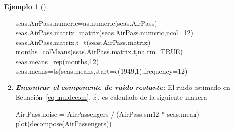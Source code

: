 \documentclass[
  us-letterpaper,
]{scrreprt}
\newenvironment{Shaded}{\begin{snugshade}}{\end{snugshade}}
\newcommand{\AttributeTok}[1]{\textcolor[rgb]{0.40,0.45,0.13}{#1}}
\newcommand{\ConstantTok}[1]{\textcolor[rgb]{0.56,0.35,0.01}{#1}}
\newcommand{\DecValTok}[1]{\textcolor[rgb]{0.68,0.00,0.00}{#1}}
\newcommand{\FunctionTok}[1]{\textcolor[rgb]{0.28,0.35,0.67}{#1}}
\newcommand{\NormalTok}[1]{\textcolor[rgb]{0.00,0.23,0.31}{#1}}
\newcommand{\OtherTok}[1]{\textcolor[rgb]{0.00,0.23,0.31}{#1}}
\newcommand{\SpecialCharTok}[1]{\textcolor[rgb]{0.37,0.37,0.37}{#1}}
\theoremstyle{definition}
\newtheorem{example}{Ejemplo}[chapter]
\theoremstyle{plain}
\theoremstyle{plain}
\theoremstyle{definition}
\theoremstyle{remark}
\begin{document}
\begin{example}[]
\begin{tcolorbox}
\begin{enumerate}
\begin{Shaded}
\begin{Highlighting}[]
\NormalTok{seas.AirPass.numeric}\OtherTok{=}\FunctionTok{as.numeric}\NormalTok{(seas.AirPass) }
\NormalTok{seas.AirPass.matrix}\OtherTok{=}\FunctionTok{matrix}\NormalTok{(seas.AirPass.numeric,}\AttributeTok{ncol=}\DecValTok{12}\NormalTok{) }
\NormalTok{seas.AirPass.matrix.t}\OtherTok{=}\FunctionTok{t}\NormalTok{(seas.AirPass.matrix) }
\NormalTok{months}\OtherTok{=}\FunctionTok{colMeans}\NormalTok{(seas.AirPass.matrix.t,}\AttributeTok{na.rm=}\ConstantTok{TRUE}\NormalTok{) }
\NormalTok{seas.means}\OtherTok{=}\FunctionTok{rep}\NormalTok{(months,}\DecValTok{12}\NormalTok{) }
\NormalTok{seas.means}\OtherTok{=}\FunctionTok{ts}\NormalTok{(seas.means,}\AttributeTok{start=}\FunctionTok{c}\NormalTok{(}\DecValTok{1949}\NormalTok{,}\DecValTok{1}\NormalTok{),}\AttributeTok{frequency=}\DecValTok{12}\NormalTok{)}
\end{Highlighting}
\end{Shaded}
\item
  \textbf{\emph{Encontrar el componente de ruido restante:}} El ruido
  estimado en Ecuación~\ref{eq-muldecom}, \(\hat{z_{_t}}\), es calculado
  de la siguiente manera

\begin{Shaded}
\begin{Highlighting}[]
\NormalTok{Air.Pass.noise }\OtherTok{=}\NormalTok{ AirPassengers }\SpecialCharTok{/}\NormalTok{ (AirPass.sm12 }\SpecialCharTok{*}\NormalTok{ seas.mean)}
\FunctionTok{plot}\NormalTok{(}\FunctionTok{decompose}\NormalTok{(AirPassengers))}
\end{Highlighting}
\end{Shaded}

  \begin{figure}[H]

\end{figure}
\end{enumerate}
\end{tcolorbox}
\end{example}
\end{document}
